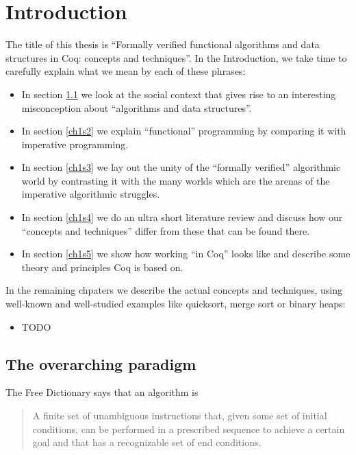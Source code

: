 \documentclass[declaration,mgr,english,shortabstract]{iithesis}
\author         {Wojciech Kołowski}
\date           {Czerwiec '20 chyba że koronawirus}                     %
\begin{document}

\chapter{Introduction} \label{ch1}

The title of this thesis is ``Formally verified functional algorithms and data structures in Coq: concepts and techniques''. In the Introduction, we take time to carefully explain what we mean by each of these phrases:

\begin{itemize}
    \item In section \ref{ch1s1} we look at the social context that gives rise to an interesting misconception about ``algorithms and data structures''.
    \item In section \ref{ch1s2} we explain ``functional'' programming by comparing it with imperative programming.
    \item In section \ref{ch1s3} we lay out the unity of the ``formally verified'' algorithmic world by contrasting it with the many worlds which are the arenas of the imperative algorithmic struggles.
    \item In section \ref{ch1s4} we do an ultra short literature review and discuss how our ``concepts and techniques'' differ from these that can be found there.
    \item In section \ref{ch1s5} we show how working ``in Coq'' looks like and describe some theory and principles Coq is based on.
\end{itemize}

In the remaining chpaters we describe the actual concepts and techniques, using well-known and well-studied examples like quicksort, merge sort or binary heaps:

\begin{itemize}
    \item TODO
\end{itemize}

\section{The overarching paradigm} \label{ch1s1}

The Free Dictionary says \cite{TheFreeDictionary} that an algorithm is

\begin{quote}
    A finite set of unambiguous instructions that, given some set of initial conditions, can be performed in a prescribed sequence to achieve a certain goal and that has a recognizable set of end conditions.
\end{quote}
\end{document}
